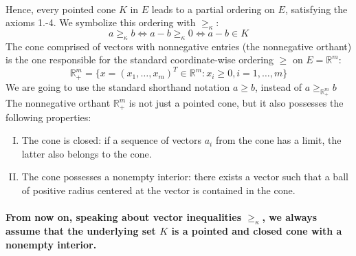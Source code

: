 \documentclass[12pt]{article}
\newcommand{\R}{\mathbb{R}}
\begin{document}
\\
	Hence, every pointed cone $K$ in $E$ leads to a partial ordering on $E$, satisfying the axioms 1.-4. We symbolize this ordering with $\geq_{\kappa}$:
	$$a \geq_{\kappa} b \Leftrightarrow a - b \geq_{\kappa} 0 \Leftrightarrow a- b \in K$$
The cone comprised of vectors with nonnegative entries (the nonnegative orthant) is the one responsible for the standard coordinate-wise ordering $\geq$ on $E = \R^m$:
$$ \R^{m}_{+} = \{ x = (x_1, \ldots, x_m)^T \in \R^m: x_i \geq 0, i = 1, \ldots, m \}$$
We are going to use the standard shorthand notation $a \geq b$, instead of $a \geq_{\R^{m}_{+}}  b$ \\
The nonnegative orthant $\R^{m}_{+}$ is not just a pointed cone, but it also possesses the following properties:
\begin{flushright}
\begin{enumerate}[I.]
\item The cone is closed: if a sequence of vectors $a_i$ from the cone has a limit, the latter also belongs to the cone.
\item The cone possesses a nonempty interior: there exists a vector such that a ball of positive radius centered at the vector is contained in the cone.
\end{enumerate}  
\end{flushright}

\paragraph{From now on, speaking about vector inequalities $\geq_{\kappa}$, we always assume that the underlying set $K$ is a pointed and closed cone with a nonempty interior. \newline}
\end{document}
